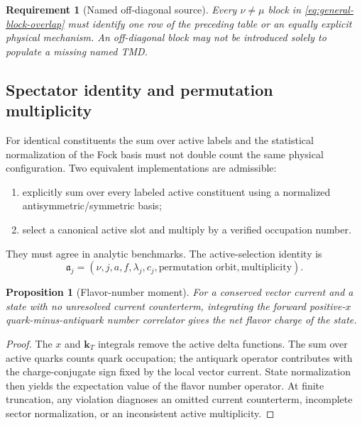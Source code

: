 \documentclass[11pt]{article}
\newtheorem{requirement}[definition]{Requirement}
\newtheorem{proposition}[definition]{Proposition}
\newcommand{\kT}{\bm{k}_{T}}
\begin{document}
\begin{requirement}[Named off-diagonal source]
\label{req:named-off-diagonal}
Every \(\nu\ne\mu\) block in \cref{eq:general-block-overlap} must identify
one row of the preceding table or an equally explicit physical mechanism.
An off-diagonal block may not be introduced solely to populate a missing
named TMD.
\end{requirement}

\subsection{Spectator identity and permutation multiplicity}

For identical constituents the sum over active labels and the statistical
normalization of the Fock basis must not double count the same physical
configuration.  Two equivalent implementations are admissible:
\begin{enumerate}
\item explicitly sum over every labeled active constituent using a normalized
      antisymmetric/symmetric basis;
\item select a canonical active slot and multiply by a verified occupation
      number.
\end{enumerate}
They must agree in analytic benchmarks.  The active-selection identity is
\begin{equation}
 \mathfrak a_j=
 (\nu,j,a,f,\lambda_j,c_j,\text{permutation orbit},\text{multiplicity}).
\label{eq:active-selection-id}
\end{equation}

\begin{proposition}[Flavor-number moment]
\label{prop:flavor-number}
For a conserved vector current and a state with no unresolved current
counterterm, integrating the forward positive-\(x\) quark-minus-antiquark
number correlator gives the net flavor charge of the state.
\end{proposition}

\begin{proof}
The \(x\) and \(\kT\) integrals remove the active delta functions.  The sum
over active quarks counts quark occupation; the antiquark operator contributes
with the charge-conjugate sign fixed by the local vector current.  State
normalization then yields the expectation value of the flavor number
operator.  At finite truncation, any violation diagnoses an omitted current
counterterm, incomplete sector normalization, or an inconsistent active
multiplicity.
\end{proof}
\end{document}

